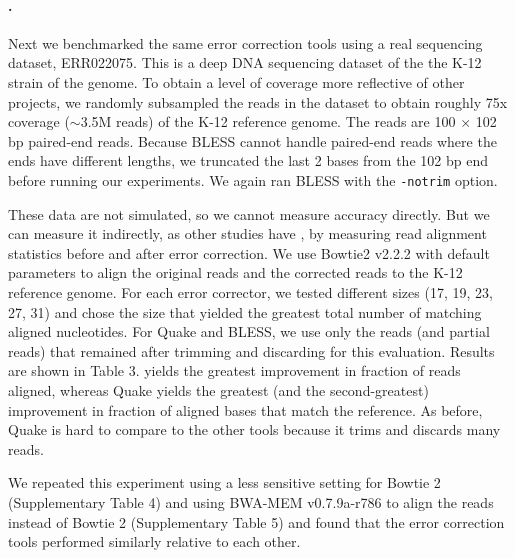 \documentclass{bmcart}
\begin{document}
\paragraph{\ecolinoemph.}  Next we benchmarked the same error correction tools using a real sequencing dataset, ERR022075.
This is a deep DNA sequencing dataset of the the K-12 strain of the \ecoli genome.
To obtain a level of coverage more reflective of other projects, we randomly subsampled the reads in the dataset to obtain roughly 75x coverage ($\sim$3.5M reads) of the \ecoli K-12 reference genome.
The reads are 100 $\times$ 102 bp paired-end reads.
Because BLESS cannot handle paired-end reads where the ends have different lengths, we truncated the last 2 bases from the 102 bp end before running our experiments.
We again ran BLESS with the \verb+-notrim+ option.

 
These data are not simulated, so we cannot measure accuracy directly.  But we can measure it indirectly, as other studies have \cite{heo2014bless}, by measuring read alignment statistics before and after error correction.  We use Bowtie2 \cite{langmead2012fast} v2.2.2 with default parameters to align the original reads and the corrected reads to the \ecoli K-12 reference genome.
For each error corrector, we tested different \kmer sizes (17, 19, 23, 27, 31) and chose the size that yielded the greatest total number of matching aligned nucleotides.
For Quake and BLESS, we use only the reads (and partial reads) that remained after trimming and discarding for this evaluation.
Results are shown in Table 3.
\tool yields the greatest improvement in fraction of reads aligned, whereas Quake yields the greatest (and \tool the second-greatest) improvement in fraction of aligned bases that match the reference.
As before, Quake is hard to compare to the other tools because it trims and discards many reads.

We repeated this experiment using a less sensitive setting for Bowtie 2 (Supplementary Table 4) and using BWA-MEM \cite{li2013aligning} v0.7.9a-r786 to align the reads instead of Bowtie 2 (Supplementary Table 5) and found that the error correction tools performed similarly relative to each other.

\end{document}
